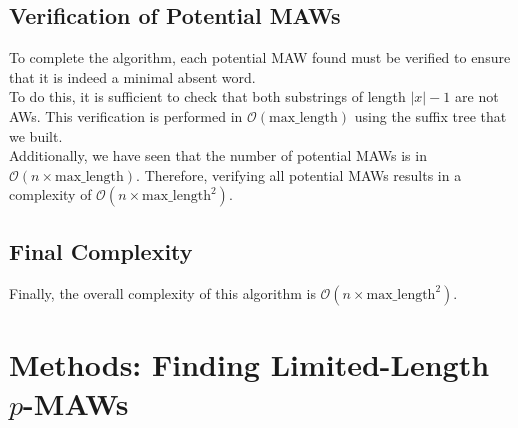 \documentclass[conference]{IEEEtran}
\begin{document}
\subsection{Verification of Potential MAWs}
To complete the algorithm, each potential MAW found must be verified to ensure that it is indeed a minimal absent word.\\
To do this, it is sufficient to check that both substrings of length $|x|-1$ are not AWs. This verification is performed in $\mathcal{O}(\text{max\_length})$ using the suffix tree that we built.\\
Additionally, we have seen that the number of potential MAWs is in $\mathcal{O}(n \times \text{max\_length})$. Therefore, verifying all potential MAWs results in a complexity of $\mathcal{O}(n \times \text{max\_length}^2)$.

\subsection{Final Complexity}
Finally, the overall complexity of this algorithm is $\mathcal{O}(n \times \text{max\_length}^2)$.
\section{Methods: Finding Limited-Length $p$-MAWs}
\end{document}
